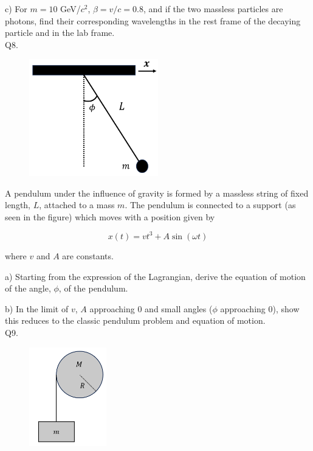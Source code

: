 \documentclass[a4paper,11pt]{article}
\begin{document}
\medskip

c) For \( m = 10 \) GeV/\( c^{2} \), \( \beta = v/c = 0.8 \), and if the two massless particles are photons, find their corresponding wavelengths in the rest frame of the decaying particle and in the lab frame. \\

Q8. 

\begin{figure}[h!]
    \centering
    \includegraphics[width=0.5\textwidth]{CMq8figure.PNG}
    \caption*{}
\end{figure}

A pendulum under the influence of gravity is formed by a massless string of fixed length, \( L \), attached to a mass \( m \). The pendulum is connected to a support (as seen in the figure) which moves with a position given by 

\[ x(t) = v t^3 + A \sin(\omega t) \]

where \( v \) and \( A \) are constants.

\medskip

a) Starting from the expression of the Lagrangian, derive the equation of motion of the angle, \( \phi \), of the pendulum. 

\medskip

b) In the limit of \( v \), \(A\) approaching 0 and small angles (\( \phi \) approaching 0), show this reduces to the classic pendulum problem and equation of motion. \\

Q9. 

\begin{figure}[h!]
    \centering
    \includegraphics[width=0.3\textwidth]{CMq9figure.PNG}
    \caption*{}
\end{figure}
\end{document}
